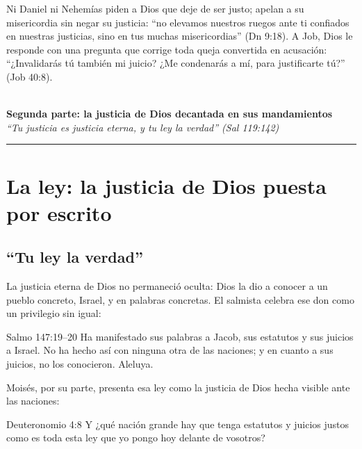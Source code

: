 Ni Daniel ni Nehemías piden a Dios que deje de ser justo; apelan a su misericordia sin negar su justicia: ``no elevamos nuestros ruegos ante ti confiados en nuestras justicias, sino en tus muchas misericordias'' (Dn 9:18). A Job, Dios le responde con una pregunta que corrige toda queja convertida en acusación: ``¿Invalidarás tú también mi juicio? ¿Me condenarás a mí, para justificarte tú?'' (Job 40:8).


\begin{center}\vspace{6pt}{\color{dorado}\rule{0.6\linewidth}{1.2pt}}\\[6pt]
{\Large\bfseries\color{azul}Segunda parte: la justicia de Dios decantada en sus mandamientos}\\[3pt]
{\small\itshape\color{gris}``Tu justicia es justicia eterna, y tu ley la verdad'' (Sal 119:142)}\\[2pt]
{\color{dorado}\rule{0.6\linewidth}{1.2pt}}\vspace{4pt}\end{center}
\section{La ley: la justicia de Dios puesta por escrito}\label{sec:ley-justo}

\subsection{“Tu ley la verdad”}
La justicia eterna de Dios no permaneció oculta: Dios la dio a conocer a un pueblo concreto, Israel, y en palabras concretas. El salmista celebra ese don como un privilegio sin igual:

\begin{verso}{Salmo 147:19–20}
Ha manifestado sus palabras a Jacob, sus estatutos y sus juicios a Israel. No ha hecho así con ninguna otra de las naciones; y en cuanto a sus juicios, no los conocieron. Aleluya.
\end{verso}

Moisés, por su parte, presenta esa ley como la justicia de Dios hecha visible ante las naciones:

\begin{verso}{Deuteronomio 4:8}
Y ¿qué nación grande hay que tenga estatutos y juicios justos como es toda esta ley que yo pongo hoy delante de vosotros?
\end{verso}

